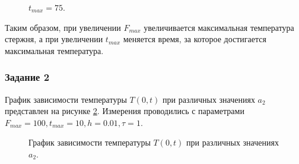 \documentclass[a4paper,14pt]{article}
\begin{document}
\newpage
\begin{figure}[!h]
	\caption{$t_{max}=75$.}
	\label{fig:t75fmax}
\end{figure}

Таким образом, при увеличении $F_{max}$ увеличивается
максимальная температура стержня, а при увеличении
$t_{max}$ меняется время, за которое достигается 
максимальная температура.

\subsubsection*{Задание 2}

График зависимости температуры $T(0, t)$ при различных значениях $a_2$
представлен на рисунке \ref{fig:as}. Измерения проводились с параметрами
$F_{max} = 100, t_{max} = 10, h = 0.01, \tau = 1$.

\newpage
\begin{figure}[!h]
	\caption{График зависимости температуры $T(0, t)$ при различных значениях $a_2$.}
	\label{fig:as}
\end{figure}
\end{document}
